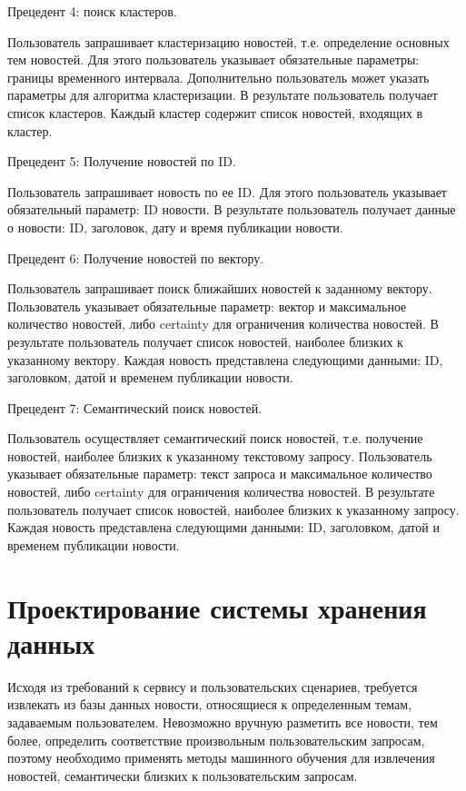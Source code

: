 Прецедент 4: поиск кластеров.

Пользователь запрашивает кластеризацию новостей, т.е. определение основных тем новостей. Для этого пользователь указывает обязательные параметры: границы временного интервала. Дополнительно пользователь может указать параметры для алгоритма кластеризации. В результате пользователь получает список кластеров. Каждый кластер содержит список новостей, входящих в кластер.

Прецедент 5: Получение новостей по ID.

Пользователь запрашивает новость по ее ID. Для этого пользователь указывает обязательный параметр: ID новости. В результате пользователь получает данные о новости: ID, заголовок, дату и время публикации новости.

Прецедент 6: Получение новостей по вектору.

Пользователь запрашивает поиск ближайших новостей к заданному вектору. Пользователь указывает обязательные параметр: вектор и максимальное количество новостей, либо certainty для ограничения количества новостей. В результате пользователь получает список новостей, наиболее близких к указанному вектору. Каждая новость представлена следующими данными: ID, заголовком, датой и временем публикации новости.

Прецедент 7: Семантический поиск новостей.

Пользователь осуществляет семантический поиск новостей, т.е. получение новостей, наиболее близких к указанному текстовому запросу. Пользователь указывает обязательные параметр: текст запроса и максимальное количество новостей, либо certainty для ограничения количества новостей. В результате пользователь получает список новостей, наиболее близких к указанному запросу. Каждая новость представлена следующими данными: ID, заголовком, датой и временем публикации новости.

\section{Проектирование системы хранения данных}
Исходя из требований к сервису и пользовательских сценариев, требуется извлекать из базы данных новости, относящиеся к определенным темам, задаваемым пользователем. Невозможно вручную разметить все новости, тем более, определить соответствие произвольным пользовательским запросам, поэтому необходимо применять методы машинного обучения для извлечения новостей, семантически близких к пользовательским запросам.

